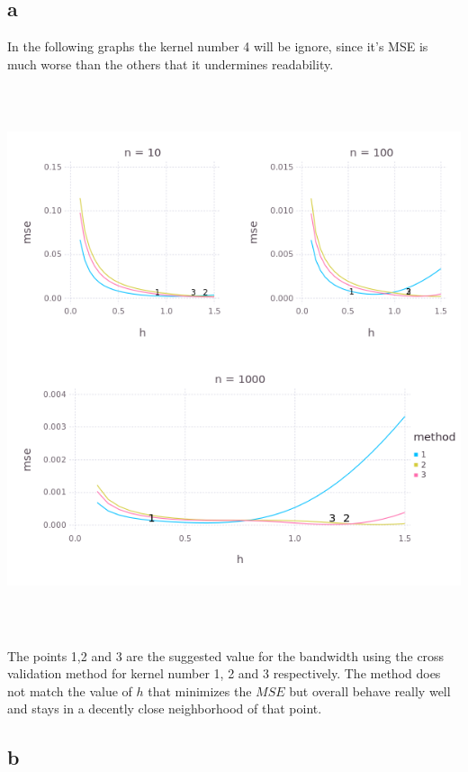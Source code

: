\documentclass{article}
\begin{document}
\subsection{a}

In the following graphs the kernel number 4 will be ignore, since it's MSE 
is much worse than the others that it undermines readability.

\begin{center}
\includegraphics[width=16cm, height=16cm]{Q2-a.png}
\end{center}

The points 1,2 and 3 are the suggested value for the bandwidth using the cross
validation method for kernel number 1, 2 and 3 respectively. The method does not
match the value of $h$ that minimizes the $MSE$ but overall behave really well and stays
in a decently close neighborhood of that point.

\subsection{b}
\end{document}
